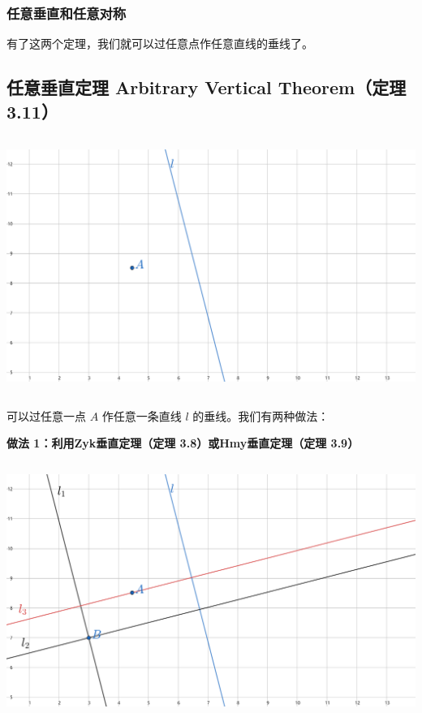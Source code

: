 \documentclass[UTF8]{article}
\begin{document}
\hypertarget{ux4efbux610fux5782ux76f4ux548cux4efbux610fux5bf9ux79f0}{%
\subsubsection{任意垂直和任意对称}\label{ux4efbux610fux5782ux76f4ux548cux4efbux610fux5bf9ux79f0}}

有了这两个定理，我们就可以过任意点作任意直线的垂线了。

\hypertarget{ux4efbux610fux5782ux76f4ux5b9aux7406-arbitrary-vertical-theoremux5b9aux7406-3.11}{%
\subsection{任意垂直定理 Arbitrary Vertical Theorem（定理
3.11）}\label{ux4efbux610fux5782ux76f4ux5b9aux7406-arbitrary-vertical-theoremux5b9aux7406-3.11}}

\includegraphics[width=5.76806in,height=3.27847in]{media/image55.png}

可以过任意一点 \(A\) 作任意一条直线 \(l\) 的垂线。我们有两种做法：

\textbf{做法 1：利用Zyk垂直定理（定理 3.8）或Hmy垂直定理（定理 3.9）}

\includegraphics[width=5.76806in,height=3.27847in]{media/image56.png}
\end{document}
